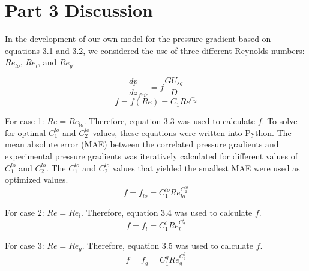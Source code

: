 \documentclass[10pt]{article}
\begin{document}
\section{Part 3 Discussion}

\hspace{15pt} In the development of our own model for the pressure gradient based on equations 3.1 and 3.2, we considered the use of three different Reynolds numbers: \(Re_{lo}\), \(Re_l\), and \(Re_g\). 

\[\frac{dp}{dz}_{fric}=f\frac{GU_{sg}}{D}\]
\[f=f(Re)=C_1Re^{C_2}\]

For case 1: \(Re=Re_{lo}\). Therefore, equation 3.3 was used to calculate \(f\). To solve for optimal \(C_1^{lo}\) and \(C_2^{lo}\) values, these equations were written into Python. The mean absolute error (MAE) between the correlated pressure gradients and experimental pressure gradients was iteratively calculated for different values of \(C_1^{lo}\) and \(C_2^{lo}\). The \(C_1^{lo}\) and \(C_2^{lo}\) values that yielded the smallest MAE were used as optimized values.
\[f=f_{lo} = C_1^{lo}Re_{lo}^{C_2^{lo}}\]


For case 2: \(Re=Re_l\). Therefore, equation 3.4 was used to calculate \(f\).
\[f=f_l = C_1^lRe_l^{C_2^l}\]


For case 3: \(Re=Re_g\). Therefore, equation 3.5 was used to calculate \(f\).
\[f=f_g = C_1^gRe_g^{C_2^g}\]
\end{document}
